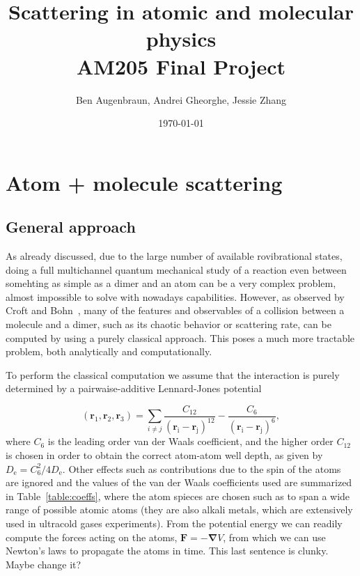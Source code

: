 \documentclass[%
 reprint,
 amsmath,amssymb,
 aps,
10pt
]{revtex4-1}
\begin{document}

\title{Scattering in atomic and molecular physics \\ AM205 Final Project}%

\author{Ben Augenbraun, Andrei Gheorghe, Jessie Zhang}

\date{\today}%

\section{\label{sec:level1}Atom + molecule scattering}
\subsection{\label{sec:level1}General approach}

As already discussed, due to the large number of available rovibrational states, doing a full multichannel quantum mechanical study of a reaction even between somehting as simple as a dimer and an atom can be a very complex problem, almost impossible to solve with nowadays capabilities. However, as observed by Croft and Bohn~\cite{bohn2014}, many of the features and observables of a collision between a molecule and a dimer, such as its chaotic behavior or scattering rate, can be computed by using a purely classical approach. This poses a much more tractable problem, both analytically and computationally. 

To perform the classical computation we assume that the interaction is purely determined by a pairwaise-additive Lennard-Jones potential

\begin{equation}
(\mathbf{r_{\mathrm{1}}}, \mathbf{r_{\mathrm{2}}}, \mathbf{r_{\mathrm{3}}}) = \sum_{i \neq j} \frac{C_{\mathrm{12}}}{(\mathbf{r_{\mathrm{i}}}-\mathbf{r_{\mathrm{j}}})^{12}} - \frac{C_{\mathrm{6}}}{(\mathbf{r_{\mathrm{i}}}-\mathbf{r_{\mathrm{j}}})^6},
\label{eq:LJ}
\end{equation}
where $C_{\mathrm{6}}$ is the leading order van der Waals coefficient, and the higher order $C_{\mathrm{12}}$ is chosen in order to obtain the correct atom-atom well depth, as given by $D_{\mathrm{e}} = C_{\mathrm{6}}^2/4D_{\mathrm{e}}$. Other effects such as contributions due to the spin of the atoms are ignored and the values of the van der Waals coefficients used are summarized in Table~\ref{table:coeffs}, where the atom spieces are chosen such as to span a wide range of possible atomic atoms (they are also alkali metals, which are extensively used in ultracold gases experiments). From the potential energy we can readily compute the forces acting on the atoms, $\mathbf{F} = -\mathbf{\nabla}V$, from which we can use Newton's laws to propagate the atoms in time. {\color{red} This last sentence is clunky. Maybe change it?}
\end{document}
